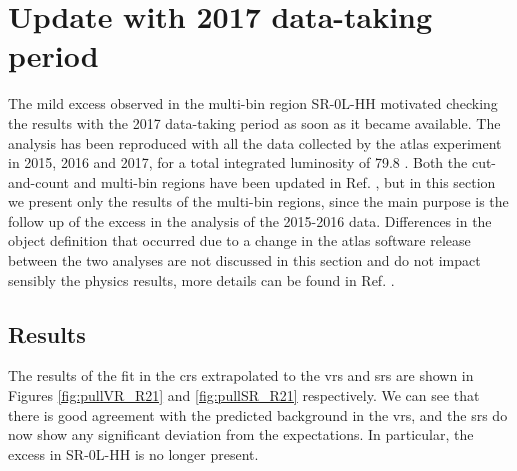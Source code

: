 \section{Update with 2017 data-taking period}
\label{sec:strong:r21}

The mild excess observed in the multi-bin region SR-0L-HH motivated checking the results with the 2017 data-taking period 
as soon as it became available. 
The analysis has been reproduced with all the data collected by the \gls{atlas} experiment in 2015, 2016 and 2017, 
for a total integrated luminosity of 79.8 \ifb. 
Both the cut-and-count and multi-bin regions have been updated in Ref. \cite{ATLAS-CONF-2018-041}, 
but in this section we present only the results 
of the multi-bin regions, since the main purpose is the follow up of the excess in the analysis of the 2015-2016 data.
Differences in the object definition that occurred due to a change in the \gls{atlas} software release between the 
two analyses are not discussed in this section and do not impact sensibly the physics results, more details can be found 
in Ref. \cite{ATLAS-CONF-2018-041}.


\subsection{Results}

The results of the fit in the \glspl{cr} extrapolated to the \glspl{vr} and \glspl{sr} are shown in Figures 
\ref{fig:pullVR_R21} and \ref{fig:pullSR_R21} respectively. 
We can see that there is good agreement with the predicted background in the \glspl{vr}, and the \glspl{sr} do now show any 
significant deviation from the expectations. 
In particular, the excess in SR-0L-HH is no longer present. 



